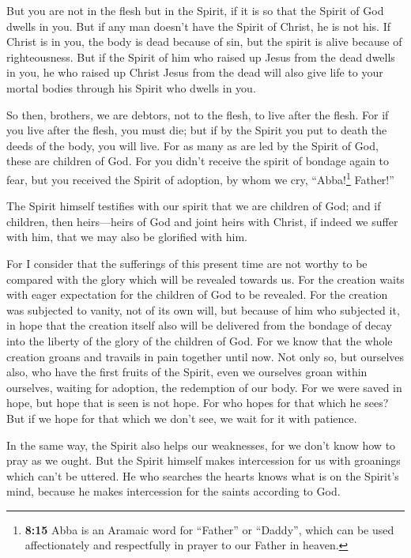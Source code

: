  But you are not in the flesh but in the Spirit, if it is
so that the Spirit of God dwells in you. But if any man doesn't have the
Spirit of Christ, he is not his.  If Christ is in you,
the body is dead because of sin, but the spirit is alive because of
righteousness.  But if the Spirit of him who raised up
Jesus from the dead dwells in you, he who raised up Christ Jesus from
the dead will also give life to your mortal bodies through his Spirit
who dwells in you.

 So then, brothers, we are debtors, not to the flesh, to
live after the flesh.  For if you live after the flesh,
you must die; but if by the Spirit you put to death the deeds of the
body, you will live.  For as many as are led by the
Spirit of God, these are children of God.  For you didn't
receive the spirit of bondage again to fear, but you received the Spirit
of adoption, by whom we cry, ``Abba!\footnote{\textbf{8:15} Abba is an
  Aramaic word for ``Father'' or ``Daddy'', which can be used
  affectionately and respectfully in prayer to our Father in heaven.}
Father!''

 The Spirit himself testifies with our spirit that we are
children of God;  and if children, then heirs---heirs of
God and joint heirs with Christ, if indeed we suffer with him, that we
may also be glorified with him.

 For I consider that the sufferings of this present time
are not worthy to be compared with the glory which will be revealed
towards us.  For the creation waits with eager
expectation for the children of God to be revealed.  For
the creation was subjected to vanity, not of its own will, but because
of him who subjected it, in hope  that the creation
itself also will be delivered from the bondage of decay into the liberty
of the glory of the children of God.  For we know that
the whole creation groans and travails in pain together until now.
 Not only so, but ourselves also, who have the first
fruits of the Spirit, even we ourselves groan within ourselves, waiting
for adoption, the redemption of our body.  For we were
saved in hope, but hope that is seen is not hope. For who hopes for that
which he sees?  But if we hope for that which we don't
see, we wait for it with patience.

 In the same way, the Spirit also helps our weaknesses,
for we don't know how to pray as we ought. But the Spirit himself makes
intercession for us with groanings which can't be uttered.
 He who searches the hearts knows what is on the Spirit's
mind, because he makes intercession for the saints according to God.

